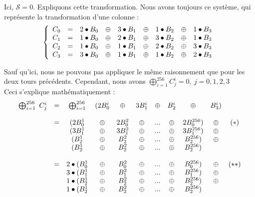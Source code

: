 \indent Ici, $\mathcal{S} = 0$. Expliquons cette transformation. Nous avons toujours ce système, qui représente la transformation d'une colonne :
$$
\left \{
    \begin{array}{c c c c c c c c c}
        C_0 & = & 2 \bullet B_0 & \oplus & 3 \bullet B_1 & \oplus & 1 \bullet B_2 & \oplus & 1 \bullet B_3  \\
        C_1 & = & 1 \bullet B_0 & \oplus & 2 \bullet B_1 & \oplus & 3 \bullet B_2 & \oplus & 1 \bullet B_3  \\
        C_2 & = & 1 \bullet B_0 & \oplus & 1 \bullet B_1 & \oplus & 2 \bullet B_2 & \oplus & 3 \bullet B_3  \\
        C_3 & = & 3 \bullet B_0 & \oplus & 1 \bullet B_1 & \oplus & 1 \bullet B_2 & \oplus & 2 \bullet B_3 
    \end{array}
\right .
$$

\indent Sauf qu'ici, nous ne pouvons pas appliquer le même raisonnement que pour les deux tours précédents. Cependant, nous avons $\bigoplus_{i=1}^{256} C_{j}^{i} = 0,\ j=0,1,2,3$ \\
\indent Ceci s'explique mathématiquement : 
$$
\begin{array}{c c c c c c c c c c c}
    \bigoplus_{i=1}^{256}\ C_{j}^{i} & = & \bigoplus_{i=1}^{256} & (2 B_{0}^{i} & \oplus & 3 B_{1}^{i} & \oplus & B_{2}^{i} & \oplus & B_{3}^{i}) & \\
    & & & & & & & & & & \\
                                    & = & (2 B_{0}^{1} & \oplus & 2 B_{0}^{2} & \oplus & ... & \oplus & 2 B_{0}^{256}) & \oplus & (*) \\
                                    & & (3 B_{1}^{1} & \oplus & 3 B_{1}^{2} & \oplus & ... & \oplus & 3 B_{1}^{256}) & \oplus & \\
                                    & & (B_{2}^{1} & \oplus & B_{2}^{2} & \oplus & ... & \oplus & B_{2}^{256}) & \oplus & \\
                                    & & (B_{2}^{1} & \oplus & B_{2}^{2} & \oplus & ... & \oplus & B_{2}^{256}) & & \\
    & & & & & & & & & & \\
                                    & = & 2 \bullet (B_{0}^{1} & \oplus & B_{0}^{2} & \oplus & ... & \oplus & B_{0}^{256}) & \oplus & (**) \\
                                    & & 3 \bullet (B_{1}^{1} & \oplus & B_{1}^{2} & \oplus & ... & \oplus & B_{1}^{256}) & \oplus & \\
                                    & & 1 \bullet (B_{2}^{1} & \oplus & B_{2}^{2} & \oplus & ... & \oplus & B_{2}^{256}) & \oplus & \\
                                    & & 1 \bullet (B_{2}^{1} & \oplus & B_{2}^{2} & \oplus & ... & \oplus & B_{2}^{256}) & &
\end{array}
$$

